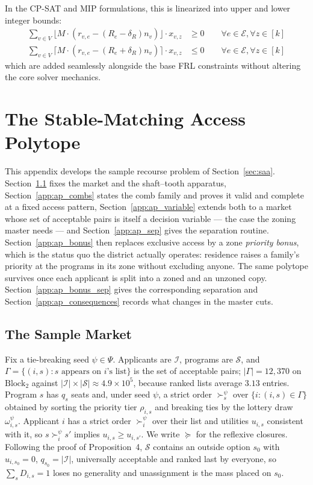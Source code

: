\documentclass{article}
\begin{document}
In the CP-SAT and MIP formulations, this is linearized into upper and lower integer bounds:
\begin{align}
\sum_{v \in V} \lfloor M \cdot (r_{v,e} - (R_e - \delta_R) n_v) \rfloor \cdot x_{v,z} &\geq 0 \qquad \forall e \in \mathcal{E}, \forall z \in [k] \\
\sum_{v \in V} \lceil M \cdot (r_{v,e} - (R_e + \delta_R) n_v) \rceil \cdot x_{v,z} &\leq 0 \qquad \forall e \in \mathcal{E}, \forall z \in [k]
\end{align}
which are added seamlessly alongside the base FRL constraints without altering the core solver mechanics.

\section{The Stable-Matching Access Polytope}
\label{app:access_polytope}

This appendix develops the sample recourse problem of Section~\ref{sec:saa}. Section~\ref{app:ap_market} fixes the market and the shaft--tooth apparatus, Section~\ref{app:ap_combs} states the comb family and proves it valid and complete at a fixed access pattern, Section~\ref{app:ap_variable} extends both to a market whose set of acceptable pairs is itself a decision variable --- the case the zoning master needs --- and Section~\ref{app:ap_sep} gives the separation routine. Section~\ref{app:ap_bonus} then replaces exclusive access by a zone \emph{priority bonus}, which is the status quo the district actually operates: residence raises a family's priority at the programs in its zone without excluding anyone. The same polytope survives once each applicant is split into a zoned and an unzoned copy. Section~\ref{app:ap_bonus_sep} gives the corresponding separation and Section~\ref{app:ap_consequences} records what changes in the master cuts.

\subsection{The Sample Market}
\label{app:ap_market}

Fix a tie-breaking seed $\psi \in \Psi$. Applicants are $\mathcal{I}$, programs are $\mathcal{S}$, and $\Gamma = \{(i,s) : s \text{ appears on } i\text{'s list}\}$ is the set of acceptable pairs; $|\Gamma| = 12{,}370$ on $\text{Block}_2$ against $|\mathcal{I}| \times |\mathcal{S}| \approx 4.9 \times 10^5$, because ranked lists average $3.13$ entries. Program $s$ has $q_s$ seats and, under seed $\psi$, a strict order $\succ_s^\psi$ over $\{i : (i,s) \in \Gamma\}$ obtained by sorting the priority tier $\rho_{i,s}$ and breaking ties by the lottery draw $\omega_{i,s}^\psi$. Applicant $i$ has a strict order $\succ_i^\psi$ over their list and utilities $u_{i,s}$ consistent with it, so $s \succ_i^\psi s'$ implies $u_{i,s} \ge u_{i,s'}$. We write $\succeq$ for the reflexive closures. Following the proof of Proposition~4, $\mathcal{S}$ contains an outside option $s_0$ with $u_{i,s_0} = 0$, $q_{s_0} = |\mathcal{I}|$, universally acceptable and ranked last by everyone, so $\sum_{s} D_{i,s} = 1$ loses no generality and unassignment is the mass placed on $s_0$.
\end{document}
